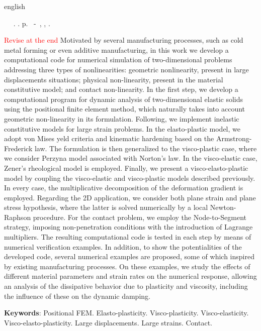 \documentclass[Tese.tex]{subfiles}
\begin{document}
	\begin{resumo}[Abstract]
		\begin{otherlanguage*}{english}
			\begin{flushleft} 
				\setlength{\absparsep}{0pt} %
				\SingleSpacing 
				\imprimirautorabr~ ~\textbf{\imprimirtitleabstract}.	\imprimirdata.  \pageref{LastPage}p. 
				\imprimirtipotrabalho~-~\imprimirinstituicao, \imprimirlocal, 	\imprimirdata. 
			\end{flushleft}
			\OnehalfSpacing 
			\textcolor{red}{Revise at the end}
			Motivated by several manufacturing processes, such as cold metal forming or even additive manufacturing, in this work we develop a computational code for numerical simulation of two-dimensional problems addressing three types of nonlinearities: geometric nonlinearity, present in large displacements situations; physical non-linearity, present in the material constitutive model; and contact non-linearity. In the first step, we develop a computational program for dynamic analysis of two-dimensional elastic solids using the positional finite element method, which naturally takes into account geometric non-linearity in its formulation. Following, we implement inelastic constitutive models for large strain problems. In the elasto-plastic model, we adopt von Mises yeld criteria and kinematic hardening based on the Armstrong-Frederick law. The formulation is then generalized to the visco-plastic case, where we consider Perzyna model associated with Norton's law. In the visco-elastic case, Zener's rheological model is employed. Finally, we present a visco-elasto-plastic model by coupling the visco-elastic and visco-plastic models described previously. In every case, the multiplicative decomposition of the deformation gradient is employed. Regarding the 2D application, we consider both plane strain and plane stress hypothesis, where the latter is solved numerically by a local Newton-Raphson procedure. For the contact problem, we employ the Node-to-Segment strategy, imposing non-penetration conditions with the introduction of Lagrange multipliers. The resulting computational code is tested in each step by means of numerical verification examples. In addition, to show the potentialities of the developed code, several numerical examples are proposed, some of which inspired by existing manufacturing processes. On these examples, we study the effects of different material parameters and strain rates on the numerical response, allowing an analysis of the dissipative behavior due to plasticity and viscosity, including the influence of these on the dynamic damping. 
			
			\vspace{\onelineskip}
			
			\noindent 
			\textbf{Keywords}: Positional FEM. Elasto-plasticity. Visco-plasticity. Visco-elasticity. Visco-elasto-plasticity. Large displacements. Large strains. Contact.
		\end{otherlanguage*}
	\end{resumo}
\end{document}
